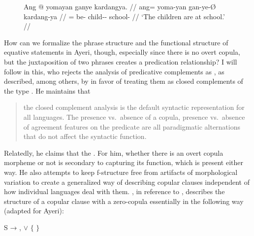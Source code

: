 \begin{figure}[h]
\ex\label{ex:ayrexstmt}\begingl
	\gla Ang @ yomayan ganye kardangya. //
	\glb ang= yoma-yan gan-ye-Ø kardang-ya //
	\glc \AgtT{}= be-\TplM{} child-\Pl{}-\Top{} school-\Loc{} //
	\glft `The children are at school.' //
\endgl\xe
\end{figure}

How can we formalize the phrase structure and the functional structure of
equative statements in Ayeri, though, especially since there is no overt
copula, but the juxtaposition of two phrases creates a predication
relationship? I will follow \citet{attia2008} in this, who rejects the analysis
of predicative complements as \XCompl{}, as described, among others, by
\citet{bresnan2016} in favor of treating them as closed complements of the
\Plink{} type \citep[70]{butt1999}. He maintains that

\blockcquote[105]{attia2008}{the closed complement analysis is the default
syntactic representation for all languages. The presence vs.\ absence of a
copula, presence vs.\ absence of agreement features on the predicate are all
paradigmatic alternations that do not affect the syntactic function.}

Relatedly, he claims that the . For him, whether there is an overt copula morpheme or
not is secondary to capturing its function, which is present either way. He
also attempts to keep f-structure free from artifacts of morphological
variation to create a generalized way of describing copular clauses
independent of how individual languages deal with them. \citet{attia2008}, in
reference to \citet{dalrymple2004}, describes the structure of a copular clause
with a zero-copula essentially in the following way (adapted for Ayeri):

\ex\label{ex:copstruct}
	S → ,  $\lor$ $\Biggl\{$\anno*[%
		\ups{\Pred}~=~%
		\astruct{null-be}{\ups{\Subj} \ups{\Plink}}%
	]{$\epsilon$} $\Biggr\}$
\xe

